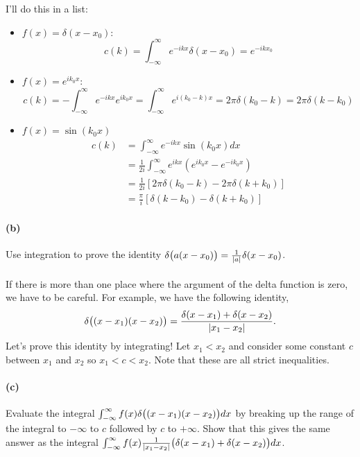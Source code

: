 \documentclass{article}
\begin{document}
\begin{solution}
	I'll do this in a list: 
	\begin{itemize}
		\item $f(x) = \delta(x - x_0)$: 
			\[
				c(k) = \int_{-\infty}^\infty e^{-ikx} \delta(x - x_0) = e^{-ikx_0}
			\] 
		\item $f(x) = e^{ik_0x}$: 
			\[
				c(k) = -\int_{-\infty}^\infty e^{-ikx} e^{ik_0x} = \int_{-\infty}^\infty e^{i(k_0-k)x} = 2\pi
				\delta(k_0-k) = 2\pi\delta(k - k_0)
			\] 
		\item $f(x) = \sin(k_0x)$
			\begin{align*}
				c(k) &= \int_{-\infty}^\infty e^{-ikx} \sin(k_0x) dx  \\
					 &= \frac{1}{2i}\int_{-\infty}^\infty e^{ikx}\left( e^{ik_0x} - e^{-ik_0x} \right)  \\
					 &= \frac{1}{2i} \left[ 2\pi\delta (k_0-k) - 2\pi\delta(k + k_0)\right]\\
					 &= \frac{\pi}{i}\left[\delta(k-k_0) - \delta(k+k_0)\right] 
			\end{align*}
	\end{itemize}
\end{solution}

\paragraph{(b)}		\extrapart
Use integration to prove the identity $\delta\big(a(x-x_{0})\big) = \frac{1}{\left|{a}\right|}\delta(x-x_{0})$.\\  


\phline
\paragraph{}
If there is more than one place where the argument of the delta function is zero, we have to be careful.  For example, we have the following identity, 
	\begin{equation*}
		\delta\big((x-x_{1})(x-x_{2})\big) = \frac{\delta(x-x_{1})+\delta(x-x_{2})}{\left|{x_{1}-x_{2}}\right|}.
	\end{equation*}
Let's prove this identity by integrating!  Let $x_{1} < x_{2}$ and consider some constant $c$ between $x_{1}$ and $x_{2}$ so $x_{1}<c<x_{2}$.  Note that these are
all strict inequalities.

\paragraph{(c)}
Evaluate the integral $\int_{-\infty}^{\infty} f(x)\delta\big((x-x_{1})(x-x_{2})\big)dx$ by breaking up the range of the integral to $-\infty$ to $c$ followed by $c$ to $+\infty$.  
Show that this gives the same answer as the integral $\int_{-\infty}^{\infty} f(x)\frac{1}{\left|{x_{1}-x_{2}}\right|}\big(\delta(x-x_{1})+\delta(x-x_{2})\big)dx$. 
\end{document}
